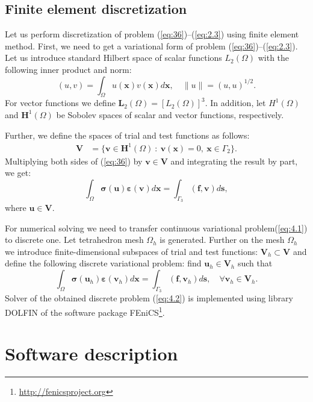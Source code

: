 \documentclass{elsarticle}
\newcommand{\tensor}[1]{\bm{#1}}
\renewcommand{\vec}[1]{\bm{#1}}
\begin{document}
\subsection{Finite element discretization}

Let us perform discretization of problem (\ref{eq:36})--(\ref{eq:2.3})
using finite element method. First, we need to get a variational form
of problem (\ref{eq:36})--(\ref{eq:2.3}). Let us introduce standard
Hilbert space of scalar functions $L_2(\Omega)$ with the following
inner product and norm:
\[
(u, v) = \int_\Omega u(\vec{x}) v(\vec{x}) d\vec{x}, \quad \| u \| =
(u, u)^{1/2}.
\]
For vector functions we define $\mathbf{L}_2(\Omega) =
[L_2(\Omega)]^3$. In addition, let $H^1(\Omega)$ and
$\mathbf{H}^1(\Omega)$ be Sobolev spaces of scalar and vector
functions, respectively.

Further, we define the spaces of trial and test functions as follows:
\begin{align*}
  \mathbf{V} &= \{ \vec{v} \in \mathbf{H}^1(\Omega)\ : \
  \vec{v}(\vec{x}) = 0, \ \vec{x} \in \Gamma_2 \} .
\end{align*}
Multiplying both sides of (\ref{eq:36}) by $\vec{v} \in \mathbf{V}$
and integrating the result by part, we get:
\begin{equation}
  \label{eq:4.1}
  \int_{\Omega} \tensor{\sigma}(\vec{u}) \tensor{\varepsilon}(\vec{v})
  d\vec{x} = \int_{\Gamma_3} (\vec{f}, \vec{v}) d\vec{s},
\end{equation}
where $\vec{u} \in \mathbf{V}$.

For numerical solving we need to transfer continuous variational
problem(\ref{eq:4.1}) to discrete one. Let tetrahedron mesh $\Omega_h$
is generated.  Further on the mesh $\Omega_h$ we introduce
\cite{Hughes2012} finite-dimensional subspaces of trial and test
functions: $\mathbf{V}_h \subset \mathbf{V}$ and define the following
discrete variational problem: find $\vec{u}_h \in \mathbf{V}_h$ such
that
\begin{equation}
  \label{eq:4.2}
  \int_{\Omega} \tensor{\sigma}(\vec{u}_h) \tensor{\varepsilon}(\vec{v}_h)
  d\vec{x} = \int_{\Gamma_3} (\vec{f}, \vec{v}_h) d\vec{s},
  \quad  \forall \vec{v}_h \in \mathbf{V}_h .
\end{equation}
Solver of the obtained discrete problem (\ref{eq:4.2}) is implemented
using library \textsf{DOLFIN} \cite{LoggWellsEtAl2012a} of the
software package \textsf{FEniCS}\footnote{\url{http://fenicsproject.org}}.

\section{Software description}
\end{document}
